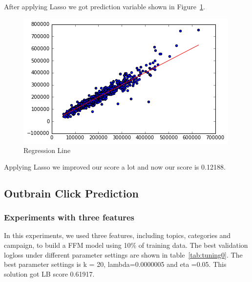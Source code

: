 \documentclass[fleqn,10pt]{SelfArx} %
\begin{document}
After applying Lasso we got prediction variable shown in Figure~\ref{fig:Figure2}.
\begin{figure}[ht]\centering %
\includegraphics[width=\linewidth]{Figure2}
\caption{Regression Line}
\label{fig:Figure2}
\end{figure}

Applying Lasso we improved our score a lot and now our score is 0.12188.


\subsection{Outbrain Click Prediction} 

\subsubsection{Experiments with three features }\label{threefeatures}
In this experiments, we used three features, including topics, categories and campaign, to build a FFM model using 10\% of training data. The best validation logloss under different parameter settings are shown in table~\ref{tab:tuning0}. The best parameter settings is k = 20, lambda=0.0000005 and eta =0.05. This solution got LB score 0.61917.
\end{document}
